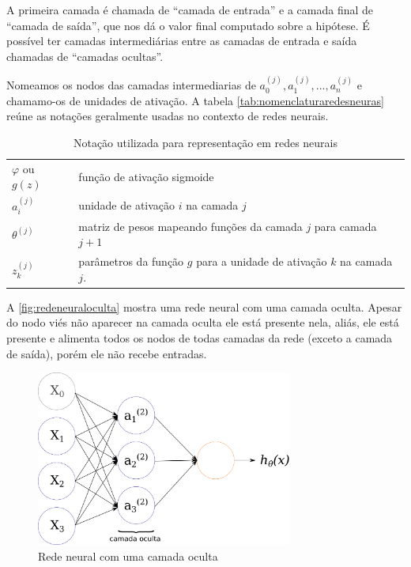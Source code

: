 A primeira camada é chamada de ``camada de entrada'' e a camada final de ``camada de saída'', que nos dá o valor final computado sobre a hipótese. É possível ter camadas intermediárias entre as camadas de entrada e saída chamadas de ``camadas ocultas''. 

Nomeamos os nodos das camadas intermediarias de $a_0^{(j)}, a_1^{(j)}, ..., a_n^{(j)}$ e chamamo-os de unidades de ativação. A tabela \autoref{tab:nomenclaturaredesneuras} reúne as notações geralmente usadas no contexto de redes neurais.

\begin{table}[!htb]
\caption{Notação utilizada para representação em redes neurais} \label{tab:nomenclaturaredesneuras}
\begin{center}
\begin{tabular}{m{2cm}m{12.0cm}}
  \toprule
  $\varphi$ ou $g(z)$ & função de ativação sigmoide\\
  $a_i^{(j)}$ 	   & unidade de ativação $i$ na camada $j$ \\
  $\theta^{(j)}$   & matriz de pesos mapeando funções da camada $j$ para camada $j+1$  \\
  $z_k^{(j)}$	&	parâmetros da função $g$ para a unidade de ativação $k$ na camada $j$. \\
  \bottomrule
\end{tabular}
\end{center}

\end{table}


A \autoref{fig:redeneuraloculta} mostra uma rede neural com uma camada oculta. Apesar do nodo viés não aparecer na camada oculta ele está presente nela, aliás, ele está presente e alimenta todos os nodos de todas camadas da rede (exceto a camada de saída), porém ele não recebe entradas.

\begin{figure}
\centering
\caption{Rede neural com uma camada oculta} \label{fig:redeneuraloculta}
\includegraphics[width=0.75\textwidth]{img/redeneuraloculta.pdf}
\end{figure}

